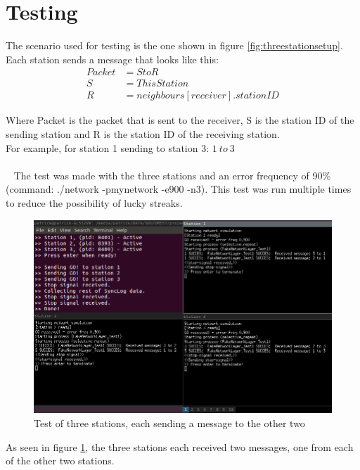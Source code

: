 \section{Testing}
The scenario used for testing is the one shown in figure \ref{fig:threestationsetup}.\\
Each station sends a message that looks like this:
\begin{align*}
Packet &= S to R\\
S &= ThisStation\\
R &= neighbours[receiver].stationID
\end{align*}

Where Packet is the packet that is sent to the receiver, S is the station ID of the sending station and R is the station ID of the receiving station.\\
For example, for station 1 sending to station 3: $1\ to\ 3$\\
\\~
The test was made with the three stations and an error frequency of 90\% (command: ./network -pmynetwork -e900 -n3). This test was run multiple times to reduce the possibility of lucky streaks.
\begin{figure}[H]
\centering
\includegraphics[width=\textwidth]{Test3.png}
\caption{Test of three stations, each sending a message to the other two}
\label{fig:threestationtest}
\end{figure}

As seen in figure \ref{fig:threestationtest}, the three stations each received two messages, one from each of the other two stations.



